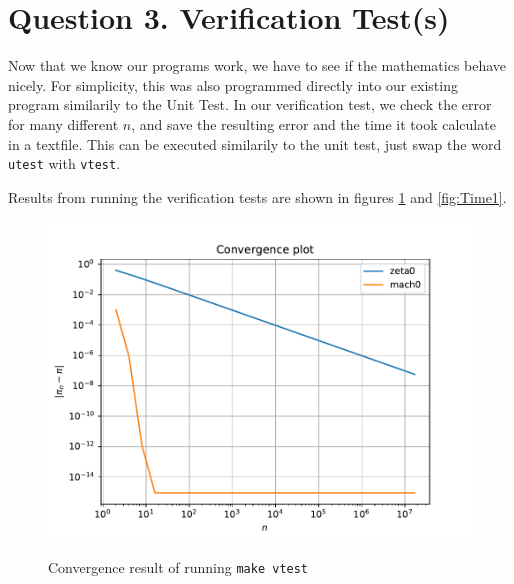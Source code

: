\documentclass[12pt]{article}
\begin{document}
\section{Question 3. Verification Test(s)}
Now that we know our programs work, we have to see if the mathematics behave nicely. For simplicity, this was also programmed directly into our existing program similarily to the Unit Test.
In our verification test, we check the error for many different $n$, and save the resulting error and the time it took calculate in a textfile. This can be executed similarily
to the unit test, just swap the word \texttt{utest} with \texttt{vtest}.

Results from running the verification tests are shown in figures \ref{fig:Convergence1} and \ref{fig:Time1}. 

\begin{figure}[!htb]
    \centering
    \caption{Convergence result of running \texttt{make vtest}}
    \includegraphics[width=\textwidth]{Convergence1}
    \label{fig:Convergence1}
\end{figure}
\end{document}
